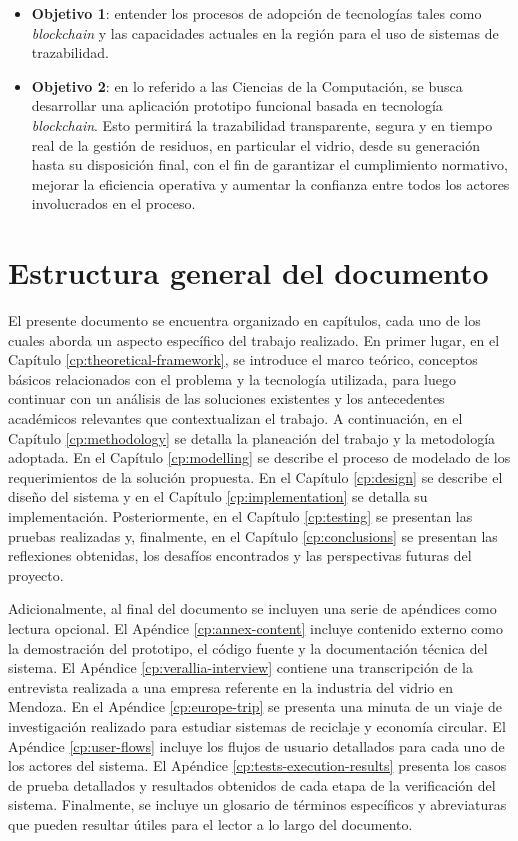 \begin{itemize}
	\item \textbf{Objetivo 1}: entender los procesos de adopción de tecnologías tales como \textit{blockchain} y las capacidades actuales en la región para el uso de sistemas de trazabilidad.
	\item \textbf{Objetivo 2}: en lo referido a las Ciencias de la Computación, se busca desarrollar una aplicación prototipo funcional basada en tecnología \textit{blockchain}. Esto permitirá la trazabilidad transparente, segura y en tiempo real de la gestión de residuos, en particular el vidrio, desde su generación hasta su disposición final, con el fin de garantizar el cumplimiento normativo, mejorar la eficiencia operativa y aumentar la confianza entre todos los actores involucrados en el proceso.
\end{itemize}

\section{Estructura general del documento}
\label{sec:document-structure}

El presente documento se encuentra organizado en capítulos, cada uno de los cuales aborda un aspecto específico del trabajo realizado. En primer lugar, en el Capítulo \ref{cp:theoretical-framework}, se introduce el marco teórico, conceptos básicos relacionados con el problema y la tecnología utilizada, para luego continuar con un análisis de las soluciones existentes y los antecedentes académicos relevantes que contextualizan el trabajo. A continuación, en el Capítulo \ref{cp:methodology} se detalla la planeación del trabajo y la metodología adoptada. En el Capítulo \ref{cp:modelling} se describe el proceso de modelado de los requerimientos de la solución propuesta. En el Capítulo \ref{cp:design} se describe el diseño del sistema y en el Capítulo \ref{cp:implementation} se detalla su implementación. Posteriormente, en el Capítulo \ref{cp:testing} se presentan las pruebas realizadas y, finalmente, en el Capítulo \ref{cp:conclusions} se presentan las reflexiones obtenidas, los desafíos encontrados y las perspectivas futuras del proyecto.

Adicionalmente, al final del documento se incluyen una serie de apéndices como lectura opcional. El Apéndice \ref{cp:annex-content} incluye contenido externo como la demostración del prototipo, el código fuente y la documentación técnica del sistema. El Apéndice \ref{cp:verallia-interview} contiene una transcripción de la entrevista realizada a una empresa referente en la industria del vidrio en Mendoza. En el Apéndice \ref{cp:europe-trip} se presenta una minuta de un viaje de investigación realizado para estudiar sistemas de reciclaje y economía circular. El Apéndice \ref{cp:user-flows} incluye los flujos de usuario detallados para cada uno de los actores del sistema. El Apéndice \ref{cp:tests-execution-results} presenta los casos de prueba detallados y resultados obtenidos de cada etapa de la verificación del sistema. Finalmente, se incluye un glosario de términos específicos y abreviaturas que pueden resultar útiles para el lector a lo largo del documento.
